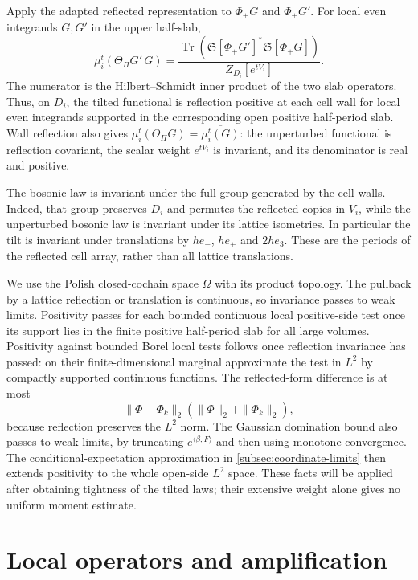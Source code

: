 \documentclass[11pt,letterpaper,reqno]{amsart}
\begin{document}
Apply the adapted reflected representation to $\Phi_+G$ and
$\Phi_+G'$. For local even integrands $G,G'$ in the upper half-slab,
\begin{equation}\label{eq:diag-tilted-positive-form}
 \mu_i^t(\Theta_\Pi G'\,G)=
 \frac{\operatorname{Tr}
          (\mathfrak S[\Phi_+G']^*\mathfrak S[\Phi_+G])}
      {Z_{D_i}[e^{tV_i}]}.
\end{equation}
The numerator is the Hilbert--Schmidt inner product of the two slab
operators. Thus, on $D_i$, the tilted functional is reflection positive
at each cell wall for local even integrands supported in the corresponding
open positive half-period slab. Wall reflection also gives
$\mu_i^t(\Theta_\Pi G)=\overline{\mu_i^t(G)}$: the unperturbed
functional is reflection covariant, the scalar weight $e^{tV_i}$
is invariant, and its denominator is real and positive.

The bosonic law is invariant under the full group generated by the
cell walls. Indeed, that group preserves $D_i$ and permutes the
reflected copies in $V_i$, while the unperturbed bosonic law is
invariant under its lattice isometries. In particular the tilt is
invariant under translations by $he_-$, $he_+$ and $2he_3$.
These are the periods of the reflected cell array, rather than all
lattice translations.

We use the Polish closed-cochain space $\Omega$ with its product
topology. The pullback by a lattice reflection or
translation is continuous, so invariance passes to weak limits.
Positivity passes for each bounded continuous local positive-side test
once its support lies in the finite positive half-period slab for all
large volumes. Positivity against bounded Borel local tests follows once reflection invariance
has passed: on their finite-dimensional marginal approximate the
test in $L^2$ by compactly supported continuous functions. The
reflected-form difference is at most
\[
 \|\Phi-\Phi_k\|_2(\|\Phi\|_2+\|\Phi_k\|_2),
\]
because reflection preserves the $L^2$ norm. The Gaussian domination
bound also passes to weak limits, by truncating
$e^{\langle\beta,F\rangle}$ and then using monotone convergence.
The conditional-expectation approximation in
\cref{subsec:coordinate-limits} then extends positivity to the whole
open-side $L^2$ space. These facts will be applied after obtaining tightness of the tilted
laws; their extensive weight alone gives no uniform moment estimate.

\section{Local operators and amplification}\label{sec:local-amplification}
\end{document}
